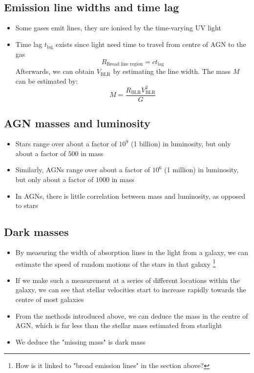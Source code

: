 \documentclass{article}
\begin{document}
\subsection{Emission line widths and time lag}
\begin{itemize}
\item Some gases emit lines, they are ionised by the time-varying UV light
\item Time lag $t_\text{lag}$ exists since light need time to travel from centre of AGN to the gas
\begin{equation}
R_\text{Broad line region}=ct_\text{lag}
\end{equation}
Afterwards, we can obtain $V_\text{BLR}$ by estimating the line width. The mass $M$ can be estimated by:
\begin{equation}
M=\frac{R_\text{BLR}V_\text{BLR}^2}{G}
\end{equation}
\end{itemize}
\subsection{AGN masses and luminosity}
\begin{itemize}
\item Stars range over about a factor of $10^9$ (1 billion) in luminosity, but only about a factor of $500$ in mass
\item Similarly, AGNs range over about a factor of $10^6$ (1 million) in luminosity, but only about a factor of $1000$ in mass
\item In AGNs, there is little correlation between mass and luminosity, as opposed to stars
\end{itemize}
\subsection{Dark masses}
\begin{itemize}
\item By measuring the width of absorption lines in the light from a galaxy, we can estimate the speed of random motions of the stars in that galaxy \footnote{How is it linked to "broad emission lines" in the section above?}
\item If we make such a measurement at a series of different locations within the galaxy, we can see that stellar velocities start to increase rapidly towards the centre of most galaxies
\item From the methods introduced above, we can deduce the mass in the centre of AGN, which is far less than the stellar mass estimated from starlight 
\item We deduce the "missing mass" is dark mass
\end{itemize}
\end{document}
